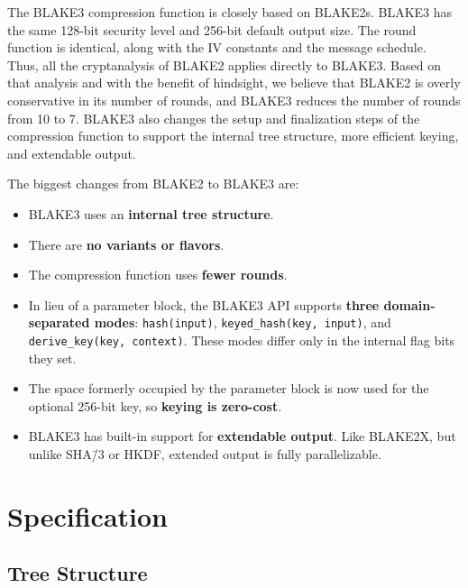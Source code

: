 \documentclass[11pt,notitlepage,a4paper]{article}
\begin{document}
The BLAKE3 compression function is closely based on BLAKE2s. BLAKE3 has the
same 128-bit security level and 256-bit default output size. The round function
is identical, along with the IV constants and the message schedule. Thus, all
the cryptanalysis of BLAKE2 applies directly to BLAKE3. Based on that analysis
and with the benefit of hindsight, we believe that BLAKE2 is overly
conservative in its number of rounds, and BLAKE3 reduces the number of rounds
from 10 to 7. BLAKE3 also changes the setup and finalization steps of the
compression function to support the internal tree structure, more efficient
keying, and extendable output.

The biggest changes from BLAKE2 to BLAKE3 are:

\begin{itemize}
    \item BLAKE3 uses an \textbf{internal tree structure}.
    \item There are \textbf{no variants or flavors}.
    \item The compression function uses \textbf{fewer rounds}.
    \item In lieu of a parameter block, the BLAKE3 API supports \textbf{three
        domain-separated modes}: \texttt{hash(input)},
        \texttt{keyed\_hash(key, input)}, and \texttt{derive\_key(key,
        context)}. These modes differ only in the internal flag bits they set.
    \item The space formerly occupied by the parameter block is now used for
        the optional 256-bit key, so \textbf{keying is zero-cost}.
    \item BLAKE3 has built-in support for \textbf{extendable output}. Like
        BLAKE2X, but unlike SHA\=/3 or HKDF, extended output is fully
        parallelizable.
\end{itemize}

\section{Specification}\label{sec:specification}

\subsection{Tree Structure}\label{sec:tree}
\end{document}
